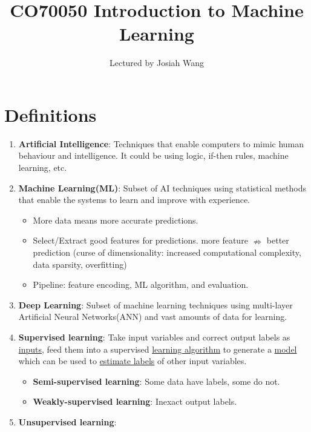 \documentclass[twocolumn,landscape,10pt]{article}
\author{Lectured by Josiah Wang}
\title{CO70050 Introduction to Machine Learning}
\affil{Typed by Aris Zhu Yi Qing}
\theoremstyle{definition}
\begin{document}
\maketitle
\tableofcontents
\newpage

\section{Definitions}

\begin{enumerate}
    \item \textbf{Artificial Intelligence}:
        Techniques that enable computers to mimic human behaviour and
        intelligence. It could be using logic, if-then rules, machine learning,
        etc.
    \item \textbf{Machine Learning(ML)}:
        Subset of AI techniques using statistical methods that enable the
        systems to learn and improve with experience.
        \begin{itemize}
            \item More data means more accurate predictions.
            \item Select/Extract good features for predictions. 
                more feature $\nRightarrow$ better prediction (curse of
                dimensionality: increased computational complexity, data sparsity,
                overfitting)
            \item Pipeline: feature encoding, ML algorithm, and evaluation.
        \end{itemize} 
    \item \textbf{Deep Learning}:
        Subset of machine learning techniques using multi-layer Artificial
        Neural Networks(ANN) and vast amounts of data for learning.
    \item \textbf{Supervised learning}:
        Take input variables and correct output labels as \underline{inputs}, 
        feed them into a supervised \underline{learning algorithm} 
        to generate a \underline{model} which can be used to
        \underline{estimate labels} of other input variables.
        \begin{itemize}
            \item \textbf{Semi-supervised learning}:
                Some data have labels, some do not.
            \item \textbf{Weakly-supervised learning}:
                Inexact output labels.
        \end{itemize} 
    \item \textbf{Unsupervised learning}:

\end{enumerate}
\end{document}
